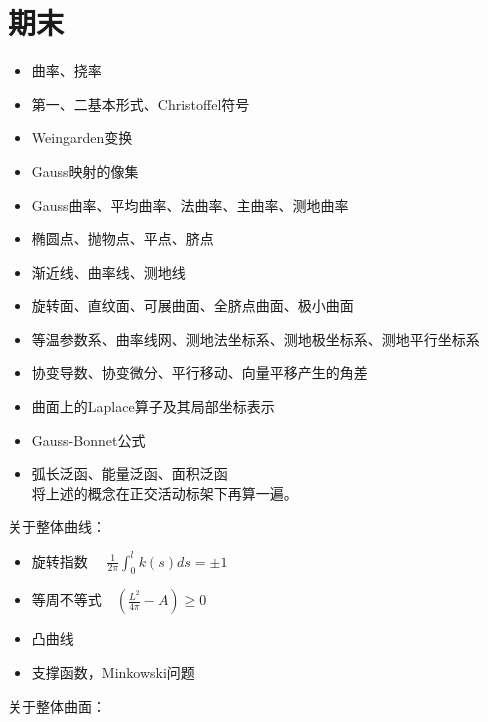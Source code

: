 \documentclass{ctexart}
\begin{document}
\section{期末}
\begin{itemize}
	\item 曲率、挠率
	\item 第一、二基本形式、Christoffel符号
	\item Weingarden变换
	\item Gauss映射的像集
	\item Gauss曲率、平均曲率、法曲率、主曲率、测地曲率
	\item 椭圆点、抛物点、平点、脐点
	\item 渐近线、曲率线、测地线
	\item 旋转面、直纹面、可展曲面、全脐点曲面、极小曲面
	\item 等温参数系、曲率线网、测地法坐标系、测地极坐标系、测地平行坐标系
	\item 协变导数、协变微分、平行移动、向量平移产生的角差
	\item 曲面上的Laplace算子及其局部坐标表示
	\item Gauss-Bonnet公式
	\item 弧长泛函、能量泛函、面积泛函\\
	将上述的概念在正交活动标架下再算一遍。
	
\end{itemize}
关于整体曲线：
\begin{itemize}
	\item 旋转指数 $\displaystyle\quad \frac{1}{2\pi} \int_{0}^{l}k(s)ds=\pm1$
	\item 等周不等式$\displaystyle\quad \left(\frac{L^2}{4\pi}-A\right)\geqslant 0$
	\item 凸曲线
	\item 支撑函数，Minkowski问题
\end{itemize}
关于整体曲面：
\end{document}

